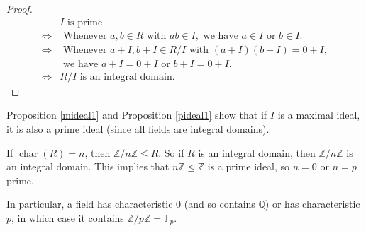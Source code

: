 \documentclass[egregdoesnotlikesansseriftitles,a4paper]{scrartcl}
\begin{document}
\begin{proof}
       \begin{align*}
            &I \text{ is prime } \\
            \iff & \text{ Whenever } a,b \in R \text{ with } ab \in I, \text{ we have } a \in I \text{ or } b \in I. \\
            \iff & \text{ Whenever } a+I,b+I \in R/I \text{ with } (a+I)(b+I)=0+I,\\& \text{ we have } a+I=0+I \text{ or } b+I=0+I.\\
            \iff & R/I \text{ is an integral domain.} 
       \end{align*}
\end{proof}
\begin{remark}
       Proposition \ref{mideal1} and Proposition \ref{pideal1} show that if $I$ is a maximal ideal, it is also a prime ideal (since all fields are integral domains).
\end{remark}
\begin{remark}
       If $\operatorname{char}(R)=n$, then $\mathbb{Z}/n\mathbb{Z} \leq R$. So if $R$ is an integral domain, then $\mathbb{Z}/n\mathbb{Z}$ is an integral domain. This implies that $n\mathbb{Z} \unlhd \mathbb{Z}$ is a prime ideal, so $n=0$ or $n=p$ prime.

       In particular, a field has characteristic 0 (and so contains $\mathbb{Q}$) or has characteristic $p$, in which case it contains $\mathbb{Z}/p\mathbb{Z}=\mathbb{F}_{p}$.
\end{remark}
\end{document}
